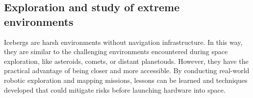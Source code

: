 %
%



\subsection{Exploration and study of extreme environments}

Icebergs are harsh environments without navigation infrastructure. In this way, they are similar to the challenging environments encountered during space exploration, like asteroids, comets, or distant planetouds. However, they have the practical advantage of being closer and more accessible. By conducting real-world robotic exploration and mapping missions, lessons can be learned and techniques developed that could mitigate risks before launching hardware into space. 

